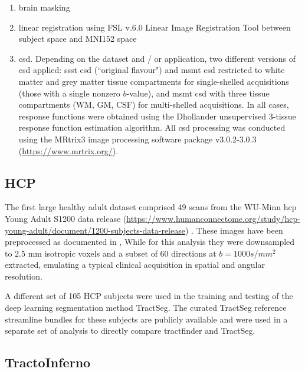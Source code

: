 \begin{enumerate}
  \item brain masking\autocite{Tournier2019}
  \item linear registration using FSL v.6.0 Linear Image Registration Tool\autocite{Jenkinson2001,Jenkinson2002} between subject space and MNI152\autocite{Fonov2011} space
  \item \gls{csd}. Depending on the dataset and / or application, two different versions of \gls{csd} applied: \gls{ssst} \gls{csd} (``original flavour")\autocite{Tournier2007,Tournier2019} and \gls{msmt} \gls{csd}\autocite{Jeurissen2014} restricted to white matter and grey matter tissue compartments for single-shelled acquisitions (those with a single nonzero $b$-value),
  and \gls{msmt} \gls{csd} with three tissue compartments (WM, GM, CSF) for multi-shelled acquisitions.
  In all cases, response functions were obtained using the Dhollander unsupervised 3-tissue response function estimation algorithm.\autocite{Dhollander2016,Dhollander2019}
  All \gls{csd} processing was conducted using the MRtrix3 image processing software package v3.0.2-3.0.3 (\url{https://www.mrtrix.org/}).\autocite{Tournier2019}
\end{enumerate}


\subsection{HCP}

The first large healthy adult dataset comprised 49 scans from the WU-Minn \gls{hcp} Young Adult S1200 data release (\url{https://www.humanconnectome.org/study/hcp-young-adult/document/1200-subjects-data-release}) \autocite{VanEssen2013}.
These images have been preprocessed as documented in \textcite{Glasser2013},
While for this analysis they were downsampled to 2.5 mm isotropic voxels and a subset of 60 directions at $b=1000 s/mm^2$ extracted, emulating a typical clinical acquisition in spatial and angular resolution.

A different set of 105 HCP subjects were used in the training and testing of the deep learning segmentation method TractSeg.\autocite{Wasserthal2018}
The curated TractSeg reference streamline bundles for these subjects are publicly available\autocite{Wasserthal2018b} and were used in a separate set of analysis to directly compare tractfinder and TractSeg.

\subsection{TractoInferno}

